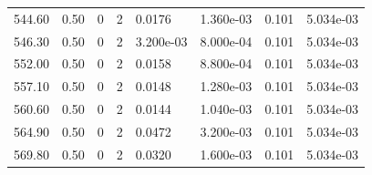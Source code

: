 \documentclass[preview]{standalone}
\begin{document}
{{{{\begin{tabular}{L{1.2cm}C{1.2cm} C{0.3cm}C{0.5cm} C{1.4cm}C{1.4cm} C{1.4cm}C{1.4cm}}
  544.60  &  0.50  & 0     &  2 &  0.0176  & 1.360e-03  & 0.101 &  5.034e-03   \\ 
  546.30  &  0.50  & 0     &  2 &  3.200e-03  & 8.000e-04  & 0.101 &  5.034e-03   \\ 
  552.00  &  0.50  & 0     &  2 &  0.0158  & 8.800e-04  & 0.101 &  5.034e-03   \\ 
  557.10  &  0.50  & 0     &  2 &  0.0148  & 1.280e-03  & 0.101 &  5.034e-03   \\ 
  560.60  &  0.50  & 0     &  2 &  0.0144  & 1.040e-03  & 0.101 &  5.034e-03   \\ 
  564.90  &  0.50  & 0     &  2 &  0.0472  & 3.200e-03  & 0.101 &  5.034e-03   \\ 
  569.80  &  0.50  & 0     &  2 &  0.0320  & 1.600e-03  & 0.101 &  5.034e-03   \\ 
\hline 
\end{tabular} 

}}}}
\end{document}
